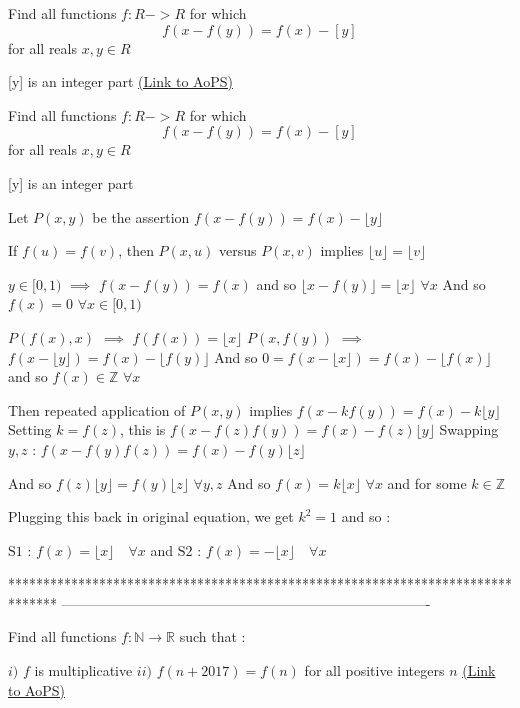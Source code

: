 \begin{problem}
	Find all functions $f:R->R$ for which
$$f(x-f(y)) =f(x) - [y] $$
for all reals $x, y\in R$

[y] is an integer part
	\flushright \href{https://artofproblemsolving.com/community/c6h1574804}{(Link to AoPS)}
\end{problem}



\begin{solution}
	\begin{tcolorbox}Find all functions $f:R->R$ for which
$$f(x-f(y)) =f(x) - [y] $$
for all reals $x, y\in R$

[y] is an integer part\end{tcolorbox}
Let $P(x,y)$ be the assertion $f(x-f(y))=f(x)-\lfloor y\rfloor$

If $f(u)=f(v)$, then $P(x,u)$ versus $P(x,v)$ implies $\lfloor u\rfloor=\lfloor v\rfloor$

$y\in[0,1)$ $\implies$ $f(x-f(y))=f(x)$ and so $\lfloor x-f(y)\rfloor=\lfloor x\rfloor$ $\forall x$
And so $f(x)=0$ $\forall x\in[0,1)$

$P(f(x),x)$ $\implies$ $f(f(x))=\lfloor x\rfloor$
$P(x,f(y))$ $\implies$ $f(x-\lfloor y\rfloor)=f(x)-\lfloor f(y)\rfloor$
And so $0=f(x-\lfloor x\rfloor)=f(x)-\lfloor f(x)\rfloor$ and so $f(x)\in\mathbb Z$ $\forall x$

Then repeated application of $P(x,y)$ implies $f(x-kf(y))=f(x)-k\lfloor y\rfloor$
Setting $k=f(z)$, this is $f(x-f(z)f(y))=f(x)-f(z)\lfloor y\rfloor$
Swapping $y,z$ : $f(x-f(y)f(z))=f(x)-f(y)\lfloor z\rfloor$

And so $f(z)\lfloor y\rfloor=f(y)\lfloor z\rfloor$ $\forall y,z$
And so $f(x)=k\lfloor x\rfloor$ $\forall x$ and for some $k\in\mathbb Z$

Plugging this back in original equation, we get $k^2=1$ and so :

$\boxed{\text{S1 : }f(x)=\lfloor x\rfloor\quad\forall x}$ and $\boxed{\text{S2 : }f(x)=-\lfloor x\rfloor\quad\forall x}$




\end{solution}
*******************************************************************************
-------------------------------------------------------------------------------

\begin{problem}
	Find all functions $f :\mathbb{N} \rightarrow \mathbb{R}$ such that :

 $i)$ $f$ is multiplicative
 $ii)$ $f(n+2017)=f(n)$ for all positive integers $n$
	\flushright \href{https://artofproblemsolving.com/community/c6h1574931}{(Link to AoPS)}
\end{problem}



